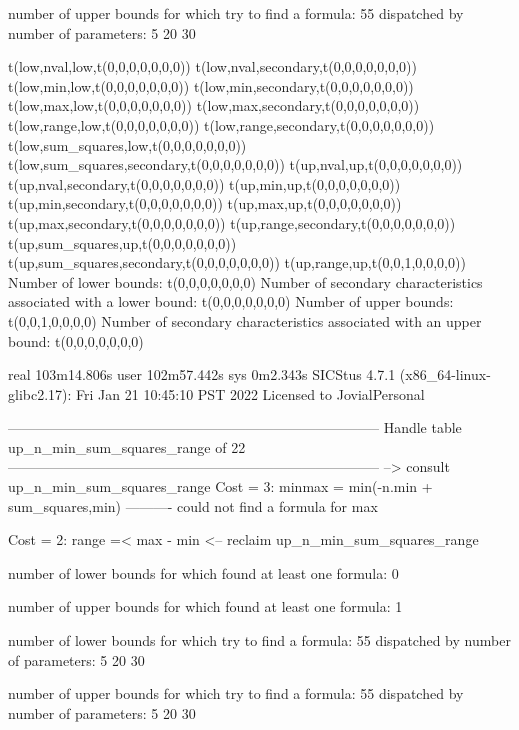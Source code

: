 number of upper bounds for which try to find a formula: 55
dispatched by number of parameters: 5  20  30

t(low,nval,low,t(0,0,0,0,0,0,0))
t(low,nval,secondary,t(0,0,0,0,0,0,0))
t(low,min,low,t(0,0,0,0,0,0,0))
t(low,min,secondary,t(0,0,0,0,0,0,0))
t(low,max,low,t(0,0,0,0,0,0,0))
t(low,max,secondary,t(0,0,0,0,0,0,0))
t(low,range,low,t(0,0,0,0,0,0,0))
t(low,range,secondary,t(0,0,0,0,0,0,0))
t(low,sum_squares,low,t(0,0,0,0,0,0,0))
t(low,sum_squares,secondary,t(0,0,0,0,0,0,0))
t(up,nval,up,t(0,0,0,0,0,0,0))
t(up,nval,secondary,t(0,0,0,0,0,0,0))
t(up,min,up,t(0,0,0,0,0,0,0))
t(up,min,secondary,t(0,0,0,0,0,0,0))
t(up,max,up,t(0,0,0,0,0,0,0))
t(up,max,secondary,t(0,0,0,0,0,0,0))
t(up,range,secondary,t(0,0,0,0,0,0,0))
t(up,sum_squares,up,t(0,0,0,0,0,0,0))
t(up,sum_squares,secondary,t(0,0,0,0,0,0,0))
t(up,range,up,t(0,0,1,0,0,0,0))
Number of lower bounds:                                             t(0,0,0,0,0,0,0)
Number of secondary characteristics associated with a lower bound:  t(0,0,0,0,0,0,0)
Number of upper bounds:                                             t(0,0,1,0,0,0,0)
Number of secondary characteristics associated with an upper bound: t(0,0,0,0,0,0,0)

real	103m14.806s
user	102m57.442s
sys	0m2.343s
SICStus 4.7.1 (x86_64-linux-glibc2.17): Fri Jan 21 10:45:10 PST 2022
Licensed to JovialPersonal


--------------------------------------------------------------------------------
Handle table up_n_min_sum_squares_range of 22
--------------------------------------------------------------------------------
--> consult up_n_min_sum_squares_range
Cost =  3:  minmax = min(-n.min + sum_squares,min)
----------
could not find a formula for max

Cost =  2:  range =< max - min
<-- reclaim up_n_min_sum_squares_range

number of lower bounds for which found at least one formula: 0

number of upper bounds for which found at least one formula: 1

number of lower bounds for which try to find a formula: 55
dispatched by number of parameters: 5  20  30

number of upper bounds for which try to find a formula: 55
dispatched by number of parameters: 5  20  30

